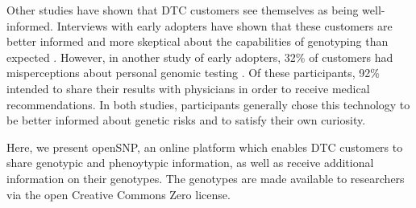 \documentclass[10pt]{article}
\begin{document}
Other studies have shown that DTC customers see themselves as being well-informed. Interviews with early adopters have shown that these customers are better informed and more skeptical about the capabilities of genotyping than expected \cite{McGowan2010}. However, in another study of early adopters, 32\% of customers had misperceptions about personal genomic testing \cite{Gollust2012}. Of these participants, 92\% intended to share their results with physicians in order to receive medical recommendations. In both studies, participants generally chose this technology to be better informed about genetic risks and to satisfy their own curiosity. 

Here, we present 
openSNP, an online platform which enables DTC customers to share genotypic and phenoytypic information, as well as receive additional information on their genotypes. The genotypes are made available to researchers via the open Creative Commons Zero license.

\end{document}
